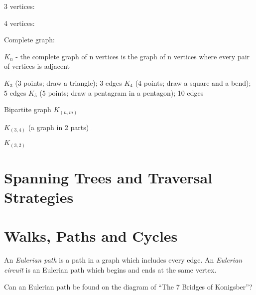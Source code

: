3 vertices:

4 vertices:


Complete graph:

$K_n$ - the complete graph of n vertices is the graph of n vertices
where every pair of vertices is adjacent

$K_3$ (3 points; draw a triangle); 3 edges
$K_4$ (4 points; draw a square and a bend); 5 edges
$K_5$ (5 points; draw a pentagram in a pentagon); 10 edges

Bipartite graph
$K_(n,m)$

$K_(3,4)$ (a graph in 2 parts) %

$K_(3,2)$



\section{Spanning Trees and Traversal Strategies}
\label{chap:SpanningTreesAndTraversalStrategies}
\section{Walks, Paths and Cycles}
\label{sec:WalksPathsCycles}

An \emph{Eulerian path} is a path in a graph which includes every edge.
An \emph{Eulerian circuit} is an Eulerian path which begins and ends at the same
vertex.

Can an Eulerian path be found on the diagram of ``The 7 Bridges of Konigsber''?

